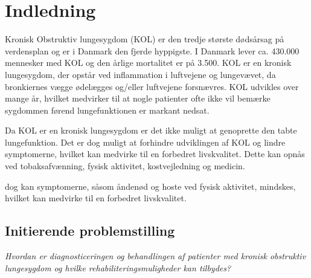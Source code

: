 \chapter{Indledning} 
Kronisk Obstruktiv lungesygdom (KOL) er den tredje største dødsårsag på verdensplan og er i Danmark den fjerde hyppigste. I Danmark lever ca. 430.000 mennesker med KOL og den årlige mortalitet er på 3.500. KOL er en kronisk lungesygdom, der opstår ved inflammation i luftvejene og lungevævet, da bronkiernes vægge ødelægges og/eller luftvejene forsnævres. KOL udvikles over mange år, hvilket medvirker til at nogle patienter ofte ikke vil bemærke sygdommen førend lungefunktionen er markant nedsat. 


Da KOL er en kronisk lungesygdom er det ikke muligt at genoprette den tabte lungefunktion. Det er dog muligt at forhindre udviklingen af KOL og lindre symptomerne, hvilket kan medvirke til en forbedret livskvalitet. Dette kan opnås ved tobaksafvænning, fysisk aktivitet, kostvejledning og medicin. 

 dog kan symptomerne, såsom åndenød og hoste ved fysisk aktivitet, mindskes, hvilket kan medvirke til en forbedret livskvalitet.  






\section{Initierende problemstilling}
\textit{Hvordan er diagnosticeringen og behandlingen af patienter med kronisk obstruktiv lungesygdom og hvilke rehabiliteringsmuligheder kan tilbydes?}